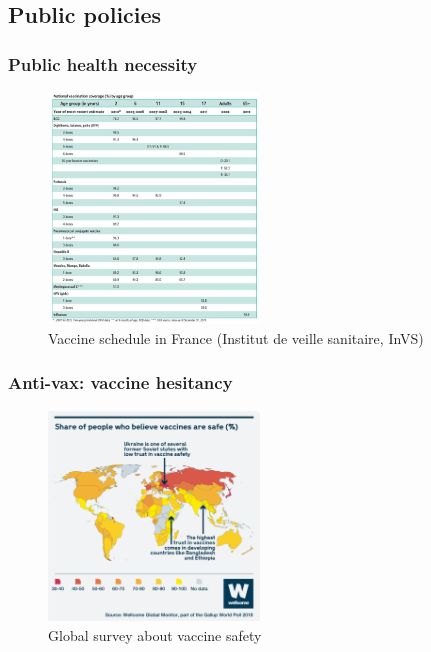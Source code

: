 \subsection{Public policies}


\begin{frame}
    \frametitle{Public health necessity}
    \begin{figure}
        \centering
        \includegraphics[width=0.5\textwidth]{imgs/VaccineSchedule.JPG}
        \caption{Vaccine schedule in France (Institut de veille sanitaire, InVS) \autocite{spfAssessmentVaccinationCoverage}}
        \label{fig:responses7}
    \end{figure}
\end{frame}

\begin{frame}
    \frametitle{Anti-vax: vaccine hesitancy}
    \begin{figure}
        \centering
        \includegraphics[width=0.5\textwidth]{imgs/VaccineHesitancy.png}
        \caption{Global survey about vaccine safety \autocite{SurveyRevealsEuropean}}
        \label{fig:responses8}
    \end{figure}
\end{frame}

